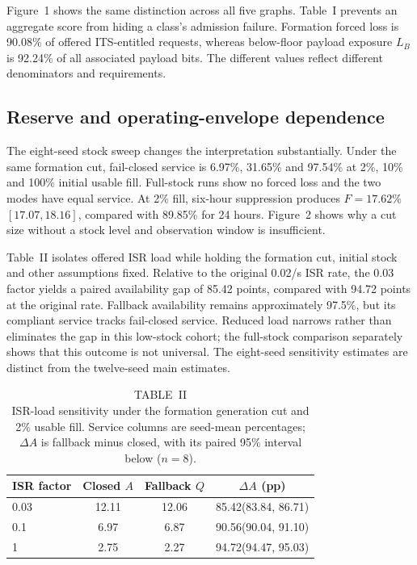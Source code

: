 \documentclass[conference,a4paper]{IEEEtran}
\newcommand{\MainForced}{90.08}
\newcommand{\MainPayloadLoss}{92.24}
\newcommand{\StockLowClosed}{6.97}
\newcommand{\StockMidClosed}{31.65}
\newcommand{\StockFullClosed}{97.54}
\newcommand{\DurationSixForced}{17.62}
\newcommand{\DurationSixForcedLo}{17.07}
\newcommand{\DurationSixForcedHi}{18.16}
\newcommand{\DurationDayForced}{89.85}
\begin{document}
Figure~1 shows the same distinction across all five graphs. Table~I prevents an aggregate score from hiding a class's admission failure. Formation forced loss is \MainForced\% of offered ITS-entitled requests, whereas below-floor payload exposure $L_B$ is \MainPayloadLoss\% of all associated payload bits. The different values reflect different denominators and requirements.

\subsection{Reserve and operating-envelope dependence}\label{sec:sensitivity}
The eight-seed stock sweep changes the interpretation substantially. Under the same formation cut, fail-closed service is \StockLowClosed\%, \StockMidClosed\% and \StockFullClosed\% at 2\%, 10\% and 100\% initial usable fill. Full-stock runs show no forced loss and the two modes have equal service. At 2\% fill, six-hour suppression produces $F=\DurationSixForced\%$ $[\DurationSixForcedLo,\DurationSixForcedHi]$, compared with \DurationDayForced\% for 24 hours. Figure~2 shows why a cut size without a stock level and observation window is insufficient.

Table~II isolates offered ISR load while holding the formation cut, initial stock and other assumptions fixed. Relative to the original 0.02/s ISR rate, the 0.03 factor yields a paired availability gap of 85.42 points, compared with 94.72 points at the original rate. Fallback availability remains approximately 97.5\%, but its compliant service tracks fail-closed service. Reduced load narrows rather than eliminates the gap in this low-stock cohort; the full-stock comparison separately shows that this outcome is not universal. The eight-seed sensitivity estimates are distinct from the twelve-seed main estimates.

\begin{table}[t]
\caption{TABLE~II\\ ISR-load sensitivity under the formation generation cut and 2\% usable fill. Service columns are seed-mean percentages; $\Delta A$ is fallback minus closed, with its paired 95\% interval below ($n=8$).}

\centering\footnotesize
\setlength{\tabcolsep}{3pt}
\begin{tabular}{@{}lccc@{}}
\toprule
ISR factor & Closed $A$ & Fallback $Q$ & $\Delta A$ (pp)\\
\midrule
0.03 & 12.11 & 12.06 & {85.42\newline (83.84, 86.71)}\\[3pt]
0.1 & 6.97 & 6.87 & {90.56\newline (90.04, 91.10)}\\[3pt]
1 & 2.75 & 2.27 & {94.72\newline (94.47, 95.03)}\\[3pt]
\bottomrule
\end{tabular}

\end{table}
\end{document}

